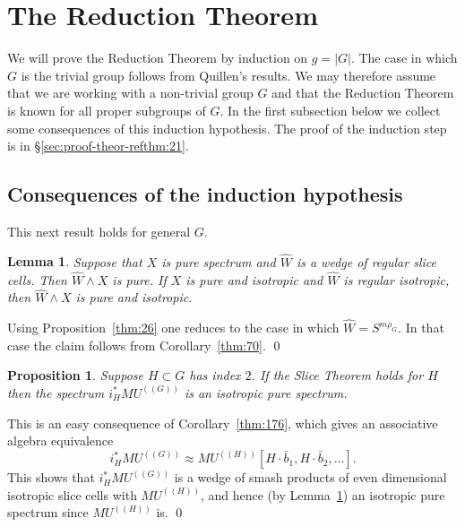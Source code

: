 \documentclass{amsart}
\newtheorem{lem}[equation]{Lemma}
\newtheorem{prop}[equation]{Proposition}
\theoremstyle{definition}
\theoremstyle{remark}
\newenvironment{pf}{\bigskip{\em Proof:\/}}{\qed\medskip}
\newcommand{\mutn}[1]{MU^{(\!(#1)\!)}}
\newcommand{\gbar}{\bar}
\newcommand{\refine}{\widehat{W}}
\begin{document}
\section{The Reduction Theorem}
\label{sec:reduction-theorem}

We will prove the Reduction Theorem by induction on $g=|G|$.  The case
in which $G$ is the trivial group follows from Quillen's results.  We
may therefore assume that we are working with a non-trivial group $G$
and that the Reduction Theorem is known for all proper subgroups of
$G$.  In the first subsection below we collect some consequences of
this induction hypothesis.  The proof of the induction step is in
\S\ref{sec:proof-theor-refthm:21}.

\subsection{Consequences of the induction hypothesis}
\label{sec:cons-induct-hypoth}

This next result holds for general $G$.

\begin{lem}
\label{thm:192} 
Suppose that $X$ is pure spectrum and $\refine$ is a
wedge of regular slice cells.  Then $\refine\wedge X$ is pure.  If $X$
is pure and isotropic and $\refine$ is regular isotropic, then
$\refine\wedge X$ is pure and isotropic.
\end{lem}

\begin{pf}
Using Proposition~\ref{thm:26} one reduces to the case in which
$\refine=S^{m\rho_{G}}$.  In that case the claim follows from
Corollary~\ref{thm:70}.
\end{pf}



\begin{prop}
\label{thm:162} Suppose $H\subset G$ has index $2$.  If the Slice
Theorem holds for $H$ then the spectrum $i_{H}^{\ast}\mutn{G}$ is an
isotropic pure spectrum.
\end{prop}

\begin{pf}
This is an easy consequence of Corollary~\ref{thm:176}, which gives an
associative algebra equivalence
\[
i_{H}^{\ast}\mutn{G} \approx \mutn{H}[H\cdot \gbar{b}_{1},H\cdot\gbar{b}_{2},\dots].
\]
This shows that $i_{H}^{\ast}\mutn{G}$ is a wedge of smash products of
even dimensional isotropic slice cells with $\mutn{H}$, and hence (by
Lemma~\ref{thm:192}) an isotropic pure spectrum since $\mutn{H}$
is.
\end{pf}
\end{document}
